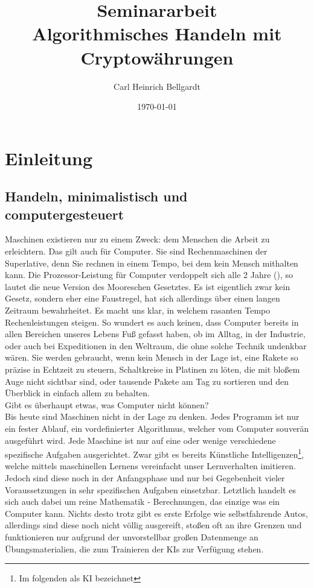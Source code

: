 \documentclass[12pt]{article}
\begin{document}
\begin{titlepage}	
	\title{\LARGE Seminararbeit\\ \large Algorithmisches Handeln mit Cryptowährungen}
	\date{\small \today}
	\author{\small Carl Heinrich Bellgardt}	
	\clearpage\maketitle
	\thispagestyle{empty}
\end{titlepage}

\setcounter{page}{2}
\tableofcontents
\pagebreak
\section{Einleitung}
\subsection{Handeln, minimalistisch und computergesteuert}
	Maschinen existieren nur zu einem Zweck: dem Menschen die Arbeit zu erleichtern. Das gilt auch für Computer. Sie sind Rechenmaschinen der Superlative, denn Sie rechnen in einem Tempo, bei dem kein Mensch mithalten kann. \glqq Die Prozessor-Leistung für Computer verdoppelt sich alle 2 Jahre\grqq{} (\cite{}),  so lautet die neue Version des Mooreschen Gesetztes. Es ist eigentlich zwar kein Gesetz, sondern eher eine Faustregel, hat sich allerdings über einen langen Zeitraum bewahrheitet. Es macht uns klar, in welchem rasanten Tempo Rechenleistungen steigen. So wundert es auch keinen, dass Computer bereits in allen Bereichen unseres Lebens Fuß gefasst haben, ob im Alltag, in der Industrie, oder auch bei Expeditionen in den Weltraum, die ohne solche Technik undenkbar wären. Sie werden gebraucht, wenn kein Mensch in der Lage ist, eine Rakete so präzise in Echtzeit zu steuern, Schaltkreise in Platinen zu löten, die mit bloßem Auge nicht sichtbar sind, oder tausende Pakete am Tag zu sortieren und den Überblick in einfach allem zu behalten.\\
	Gibt es überhaupt etwas, was Computer nicht können?\\
	Bis heute sind Maschinen nicht in der Lage zu denken. Jedes Programm ist nur ein fester Ablauf, ein vordefinierter Algorithmus, welcher vom Computer souverän ausgeführt wird. Jede Maschine ist nur auf eine oder wenige verschiedene spezifische Aufgaben ausgerichtet. Zwar gibt es bereits Künstliche Intelligenzen\footnote{Im folgenden als \glqq KI\grqq{} bezeichnet}, welche mittels maschinellen Lernens vereinfacht unser Lernverhalten imitieren. Jedoch sind diese noch in der Anfangsphase und nur bei Gegebenheit vieler Voraussetzungen in sehr spezifischen Aufgaben einsetzbar. Letztlich handelt es sich auch dabei um reine Mathematik - Berechnungen, das einzige was ein Computer kann. Nichts desto trotz gibt es erste Erfolge wie selbstfahrende Autos, allerdings sind diese noch nicht völlig ausgereift, stoßen oft an ihre Grenzen und funktionieren nur aufgrund der unvorstellbar großen Datenmenge an Übungsmaterialien, die zum Trainieren der KIs zur Verfügung stehen.\\
\end{document}
